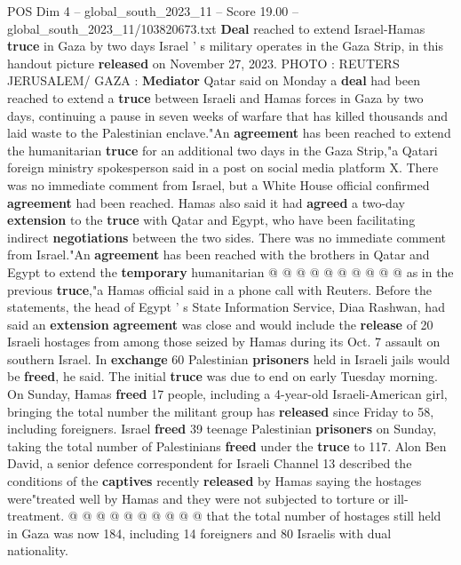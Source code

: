 \begin{textsample}{POS Dim 4 – global\_south\_2023\_11 – Score 19.00 – global\_south\_2023\_11/103820673.txt}  \label{ex:f4_pos_159}
\textbf{Deal} reached to extend Israel-Hamas \textbf{truce} in Gaza by two days Israel ' s military operates in the Gaza Strip, in this handout picture \textbf{released} on November 27, 2023.
PHOTO : REUTERS JERUSALEM/ GAZA : \textbf{Mediator} Qatar said on Monday a \textbf{deal} had been reached to extend a \textbf{truce} between Israeli and Hamas forces in Gaza by two days, continuing a pause in seven weeks of warfare that has killed thousands and laid waste to the Palestinian enclave."An \textbf{agreement} has been reached to extend the humanitarian \textbf{truce} for an additional two days in the Gaza Strip,"a Qatari foreign ministry spokesperson said in a post on social media platform X.
There was no immediate comment from Israel, but a White House official confirmed \textbf{agreement} had been reached.
Hamas also said it had \textbf{agreed} a two-day \textbf{extension} to the \textbf{truce} with Qatar and Egypt, who have been facilitating indirect \textbf{negotiations} between the two sides.
There was no immediate comment from Israel."An \textbf{agreement} has been reached with the brothers in Qatar and Egypt to extend the \textbf{temporary} humanitarian @ @ @ @ @ @ @ @ @ @ as in the previous \textbf{truce},"a Hamas official said in a phone call with Reuters.
Before the statements, the head of Egypt ' s State Information Service, Diaa Rashwan, had said an \textbf{extension} \textbf{agreement} was close and would include the \textbf{release} of 20 Israeli hostages from among those seized by Hamas during its Oct. 7 assault on southern Israel.
In \textbf{exchange} 60 Palestinian \textbf{prisoners} held in Israeli jails would be \textbf{freed}, he said.
The initial \textbf{truce} was due to end on early Tuesday morning.
On Sunday, Hamas \textbf{freed} 17 people, including a 4-year-old Israeli-American girl, bringing the total number the militant group has \textbf{released} since Friday to 58, including foreigners.
Israel \textbf{freed} 39 teenage Palestinian \textbf{prisoners} on Sunday, taking the total number of Palestinians \textbf{freed} under the \textbf{truce} to 117.
Alon Ben David, a senior defence correspondent for Israeli Channel 13 described the conditions of the \textbf{captives} recently \textbf{released} by Hamas saying the hostages were"treated well by Hamas and they were not subjected to torture or ill-treatment. @ @ @ @ @ @ @ @ @ @ that the total number of hostages still held in Gaza was now 184, including 14 foreigners and 80 Israelis with dual nationality.

\end{textsample}
